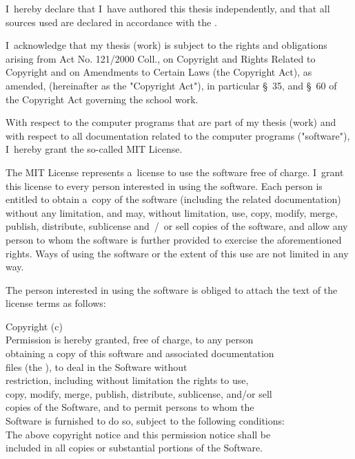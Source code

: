 I~hereby declare that I~have authored this thesis independently,
and that all sources used are declared in accordance with the
.

\vspace{2mm}
I~acknowledge that my thesis (work) is subject to the rights and obligations
arising from Act No. 121/2000 Coll., on Copyright and Rights Related to Copyright
and on Amendments to Certain Laws (the Copyright Act), as amended,
(hereinafter as the "Copyright Act"), in particular §~35, and §~60 of the Copyright Act
governing the school work.

\vspace{2mm}
With respect to the computer programs that are part of my thesis (work)
and with respect to all documentation related to the computer programs ("software"),
I~hereby grant the so-called MIT License.

\vspace{2mm}
The MIT License represents a~license to use the software free of charge.
I~grant this license to every person interested in using the software.
Each person is entitled to obtain a~copy of the software (including
the related documentation) without any limitation, and may, without limitation,
use, copy, modify, merge, publish, distribute, sublicense and~/~or sell
copies of the software, and allow any person to whom the software is further
provided to exercise the aforementioned rights. Ways of using the software or the extent
of this use are not limited in any way.

\vspace{2mm}
The person interested in using the software is obliged to attach the text of the license terms as follows:

\vspace{3mm}
\noindent
Copyright (c) \RokOdevzdani~\AutorPrace \\
Permission is hereby granted, free of charge, to any person \\
obtaining a copy of this software and associated documentation \\
files (the ), to deal in the Software without \\
restriction, including without limitation the rights to use, \\
copy, modify, merge, publish, distribute, sublicense, and/or sell \\
copies of the Software, and to permit persons to whom the \\
Software is furnished to do so, subject to the following conditions: \\
The above copyright notice and this permission notice shall be \\
included in all copies or substantial portions of the Software.

